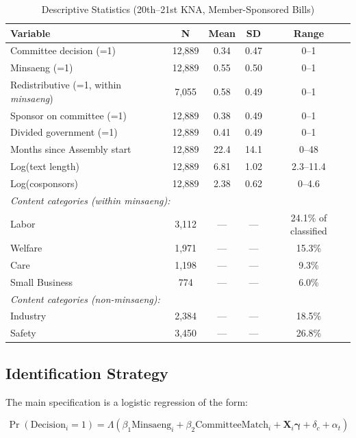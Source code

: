 \documentclass[11pt]{article}
\begin{document}
\begin{table}[htbp]
\centering
\caption{Descriptive Statistics (20th--21st KNA, Member-Sponsored Bills)}
\label{tab:desc}
\begin{tabular}{lcccc}
\toprule
Variable & N & Mean & SD & Range \\
\midrule
Committee decision (=1) & 12,889 & 0.34 & 0.47 & 0--1 \\
Minsaeng (=1) & 12,889 & 0.55 & 0.50 & 0--1 \\
Redistributive (=1, within \emph{minsaeng}) & 7,055 & 0.58 & 0.49 & 0--1 \\
Sponsor on committee (=1) & 12,889 & 0.38 & 0.49 & 0--1 \\
Divided government (=1) & 12,889 & 0.41 & 0.49 & 0--1 \\
Months since Assembly start & 12,889 & 22.4 & 14.1 & 0--48 \\
Log(text length) & 12,889 & 6.81 & 1.02 & 2.3--11.4 \\
Log(cosponsors) & 12,889 & 2.38 & 0.62 & 0--4.6 \\
\midrule
\multicolumn{5}{l}{\textit{Content categories (within \emph{minsaeng}):}} \\
\quad Labor & 3,112 & --- & --- & 24.1\% of classified \\
\quad Welfare & 1,971 & --- & --- & 15.3\% \\
\quad Care & 1,198 & --- & --- & 9.3\% \\
\quad Small Business & 774 & --- & --- & 6.0\% \\
\midrule
\multicolumn{5}{l}{\textit{Content categories (non-\emph{minsaeng}):}} \\
\quad Industry & 2,384 & --- & --- & 18.5\% \\
\quad Safety & 3,450 & --- & --- & 26.8\% \\
\bottomrule
\end{tabular}
\end{table}


\subsection{Identification Strategy}\label{sec:identification}

The main specification is a logistic regression of the form:

\begin{equation}
\Pr(\text{Decision}_i = 1) = \Lambda(\beta_1 \text{Minsaeng}_i + \beta_2 \text{CommitteeMatch}_i + \mathbf{X}_i \boldsymbol{\gamma} + \delta_c + \alpha_t)
\label{eq:main}
\end{equation}
\end{document}
